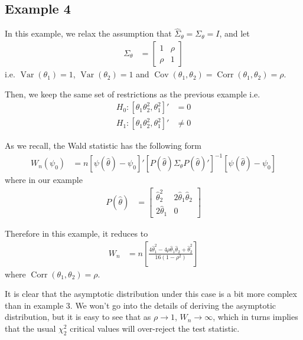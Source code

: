 \documentclass[11pt]{article}\usepackage[]{graphicx}\usepackage[]{color}
\DeclareMathOperator{\Corr}{Corr}
\DeclareMathOperator{\Var}{Var}
\DeclareMathOperator{\Cov}{Cov}
\begin{document}
\subsection{Example 4}

In this example, we relax the assumption that $\hat{\Sigma}_\theta=\Sigma_\theta=I$, and let
\begin{align}
	\Sigma_\theta & = \left[ \begin{array}{cc}
		1 & \rho  \\
		\rho  & 1
	\end{array} \right]
\end{align}
i.e. $\Var(\theta_1)=1$, $\Var(\theta_2)=1$ and $\Cov(\theta_1,\theta_2)=\Corr(\theta_1,\theta_2)=\rho$.

Then, we keep the same set of restrictions as the previous example i.e.
\begin{align}
	H_0: [\theta_1 \theta_2^2 , \theta_1^2]' & = 0 \\
	H_1: [\theta_1 \theta_2^2 , \theta_1^2]'  & \neq 0
\end{align}

As we recall, the Wald statistic has the following form
\begin{align}
	W_n(\psi_0) & = n \left[\psi (\hat{\theta}) - \psi_0\right]' \left[P (\hat{\theta})\Sigma_\theta P (\hat{\theta})'\right]^{-1} \left[\psi (\hat{\theta}) - \psi_0\right]
\end{align}
where in our example
\begin{align}
	P(\hat{\theta}) & = \left[ \begin{array}{cc}
		\hat{\theta}_2^2 & 2\hat{\theta}_1 \hat{\theta}_2 \\
		2\hat{\theta}_1 & 0
	\end{array} \right]
\end{align}

Therefore in this example, it reduces to
\begin{align}
	W_n & = n\left[ \frac{4\hat{\theta}_1^2-4\rho\hat{\theta}_1\hat{\theta}_2+\hat{\theta}_2^2}{16(1-\rho^2)}\right]
\end{align}
where $\Corr(\theta_1,\theta_2)=\rho$.

It is clear that the asymptotic distribution under this case is a bit more complex than in example 3. We won't go into the details of deriving the asymptotic distribution, but it is easy to see that as $\rho \rightarrow 1$, $W_n \rightarrow \infty$, which in turns implies that the usual $\chi^2_2$ critical values will over-reject the test statistic.
\end{document}
